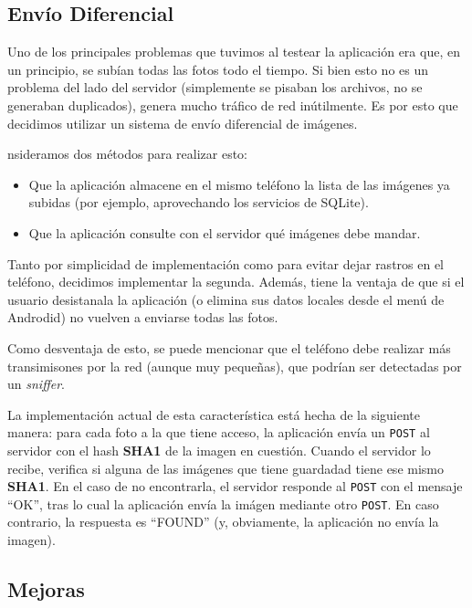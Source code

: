 
\subsection{Envío Diferencial} %
\label{ssub:Envío Diferencial}
Uno de los principales problemas que tuvimos al testear la aplicación era que, en un principio, se subían todas las fotos todo el tiempo. Si bien esto no es un problema del lado del servidor (simplemente se pisaban los archivos, no se generaban duplicados), genera mucho tráfico de red inútilmente. Es por esto que decidimos utilizar un sistema de envío diferencial de imágenes.

nsideramos dos métodos para realizar esto:
\begin{itemize}
	\item Que la aplicación almacene en el mismo teléfono la lista de las imágenes ya subidas (por ejemplo, aprovechando los servicios de SQLite).
	\item Que la aplicación consulte con el servidor qué imágenes debe mandar.
\end{itemize}

Tanto por simplicidad de implementación como para evitar dejar rastros en el teléfono, decidimos implementar la segunda. Además, tiene la ventaja de que si el usuario desistanala la aplicación (o elimina sus datos locales desde el menú de Androdid) no vuelven a enviarse todas las fotos.

Como desventaja de esto, se puede mencionar que el teléfono debe realizar más transimisones por la red (aunque muy pequeñas), que podrían ser detectadas por un \emph{sniffer}.

La implementación actual de esta característica está hecha de la siguiente manera: para cada foto a la que tiene acceso, la aplicación envía un \texttt{POST} al servidor con el hash \textbf{SHA1} de la imagen en cuestión. Cuando el servidor lo recibe, verifica si alguna de las imágenes que tiene guardadad tiene ese mismo \textbf{SHA1}. En el caso de no encontrarla, el servidor responde al \texttt{POST} con el mensaje ``OK'', tras lo cual la aplicación envía la imágen mediante otro \texttt{POST}.
En caso contrario, la respuesta es ``FOUND'' (y, obviamente, la aplicación no envía la imagen).

\subsection{Mejoras} %

